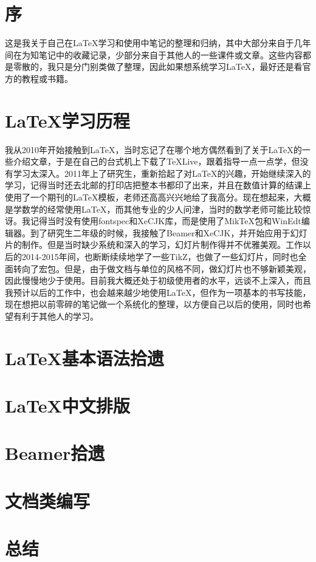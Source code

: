 \documentclass[11pt]{ctexart}
\title{\heiti{\LaTeX 总结}}
\author{\kaishu{北方以北}}
\begin{document}
\maketitle

\tableofcontents

\section{序}

这是我关于自己在\LaTeX 学习和使用中笔记的整理和归纳，其中大部分来自于几年间在为知笔记中的收藏记录，少部分来自于其他人的一些课件或文章。这些内容都是零散的，我只是分门别类做了整理，因此如果想系统学习\LaTeX ，最好还是看官方的教程或书籍。

\section{\LaTeX 学习历程}

我从2010年开始接触到\LaTeX ，当时忘记了在哪个地方偶然看到了关于\LaTeX 的一些介绍文章，于是在自己的台式机上下载了\TeX Live，跟着指导一点一点学，但没有学习太深入。2011年上了研究生，重新拾起了对\LaTeX 的兴趣，开始继续深入的学习，记得当时还去北邮的打印店把整本书都印了出来，并且在数值计算的结课上使用了一个期刊的\LaTeX 模板，老师还高高兴兴地给了我高分。现在想起来，大概是学数学的经常使用\LaTeX ，而其他专业的少人问津，当时的数学老师可能比较惊讶。我记得当时没有使用fontspec和XeCJK库，而是使用了MikTeX包和WinEdt编辑器。到了研究生二年级的时候，我接触了Beamer和XeCJK，并开始应用于幻灯片的制作。但是当时缺少系统和深入的学习，幻灯片制作得并不优雅美观。工作以后的2014-2015年间，也断断续续地学了一些TikZ，也做了一些幻灯片，同时也全面转向了\CTeX 宏包。但是，由于做文档与单位的风格不同，做幻灯片也不够新颖美观，因此慢慢地少于使用。目前我大概还处于初级使用者的水平，远谈不上深入，而且我预计以后的工作中，也会越来越少地使用\LaTeX ，但作为一项基本的书写技能，现在想把以前零碎的笔记做一个系统化的整理，以方便自己以后的使用，同时也希望有利于其他人的学习。

\section{\LaTeX 基本语法拾遗}

\section{\LaTeX 中文排版}

\section{Beamer拾遗}

\section{文档类编写}

\section{总结}
\end{document}
